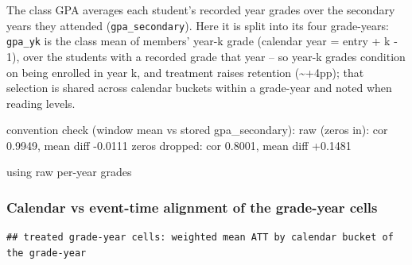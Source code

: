 \documentclass[
]{article}
\begin{document}
The class GPA averages each student's recorded year grades over the
secondary years they attended (\texttt{gpa\_secondary}). Here it is
split into its four grade-years: \texttt{gpa\_yk} is the class mean of
members' year-k grade (calendar year = entry + k - 1), over the students
with a recorded grade that year -- so year-k grades condition on being
enrolled in year k, and treatment raises retention
(\textasciitilde+4pp); that selection is shared across calendar buckets
within a grade-year and noted when reading levels.

convention check (window mean vs stored gpa\_secondary): raw (zeros in):
cor 0.9949, mean diff -0.0111 \textbar{} zeros dropped: cor 0.8001, mean
diff +0.1481

using raw per-year grades

\begin{table}[htbp]
   \caption{GPA Effect by Grade-Year: All 9th-Grade Entrants}\label{tab: gpa by grade year}
   \centerline{}
\end{table}

\hypertarget{calendar-vs-event-time-alignment-of-the-grade-year-cells}{%
\subsubsection{Calendar vs event-time alignment of the grade-year
cells}\label{calendar-vs-event-time-alignment-of-the-grade-year-cells}}

\begin{verbatim}
## treated grade-year cells: weighted mean ATT by calendar bucket of the grade-year
\end{verbatim}
\end{document}
